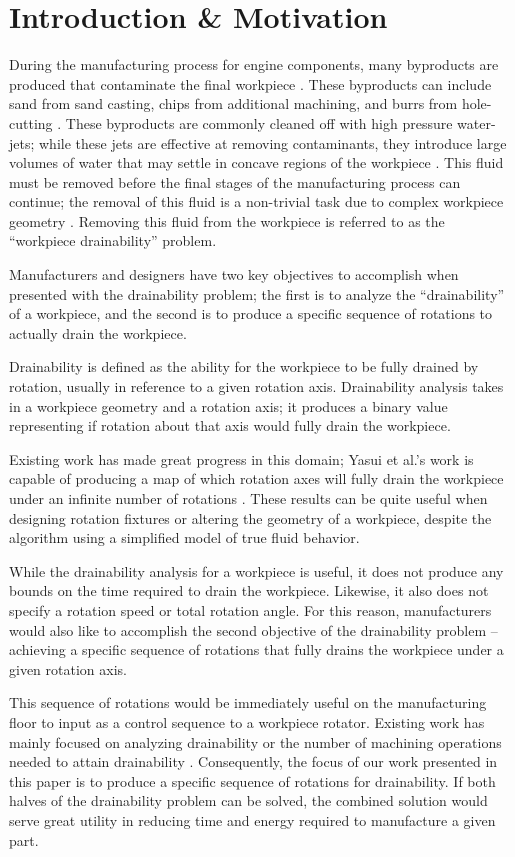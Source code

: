 							\chapter{Introduction \& Motivation}


During the manufacturing process for engine components, many byproducts are produced that contaminate the final workpiece \cite{Hancock94}. These byproducts can include sand from sand casting, chips from additional machining, and burrs from hole-cutting \cite{Arbelaez}.
These byproducts are commonly cleaned off with high pressure water-jets; while these jets are effective at removing contaminants, they introduce large volumes of water that may settle in concave regions of the workpiece \cite{Arbelaez}. This fluid must be removed before the final stages of the manufacturing process can continue; the removal of this fluid is a non-trivial task due to complex workpiece geometry \cite{Avila} \cite{Yasui2011}. Removing this fluid from the workpiece is referred to as the ``workpiece drainability'' problem.

Manufacturers and designers have two key objectives to accomplish when presented with the drainability problem; the first is to analyze the ``drainability'' of a workpiece, and the second is to produce a specific sequence of rotations to actually drain the workpiece.

Drainability is defined as the ability for the workpiece to be fully drained by rotation, usually in reference to a given rotation axis. Drainability analysis takes in a workpiece geometry and a rotation axis; it produces a binary value representing if rotation about that axis would fully drain the workpiece.

Existing work has made great progress in this domain; Yasui et al.'s work is capable of producing a map of which rotation axes will fully drain the workpiece under an infinite number of rotations \cite{Yasui2011}. These results can be quite useful when designing rotation fixtures or altering the geometry of a workpiece, despite the algorithm using a simplified model of true fluid behavior.

While the drainability analysis for a workpiece is useful, it does not produce any bounds on the time required to drain the workpiece. Likewise, it also does not specify a rotation speed or total rotation angle. For this reason, manufacturers would also like to accomplish the second objective of the drainability problem -- achieving a specific sequence of rotations that fully drains the workpiece under a given rotation axis.

This sequence of rotations would be immediately useful on the manufacturing floor to input as a control sequence to a workpiece rotator. Existing work has mainly focused on analyzing drainability \cite{Yasui2011} or the number of machining operations needed to attain drainability \cite{Aloupis_draininga}. Consequently, the focus of our work presented in this paper is to produce a specific sequence of rotations for drainability. If both halves of the drainability problem can be solved, the combined solution would serve great utility in reducing time and energy required to manufacture a given part.

